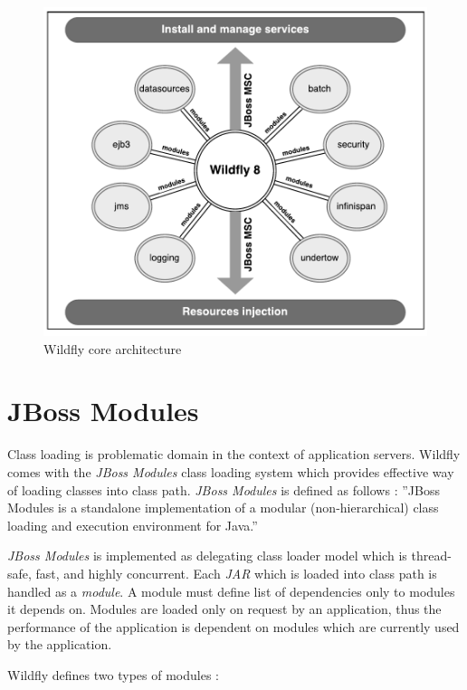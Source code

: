 \documentclass[12pt,oneside]{fithesis2}
\begin{document}
\begin{figure}[ht!]
	\centering
	\includegraphics[width=\textwidth]{images/wildfly_core}
	\caption{Wildfly core architecture \cite{wildfly_book}}
	\label{wildfly_core}
\end{figure}

\section{JBoss Modules}
\label{jboss_modules_sec}
Class loading is problematic domain in the context of application servers. Wildfly comes with the \textit{JBoss Modules} class loading system which provides effective way of loading classes into class path. \textit{JBoss Modules} is defined as follows \cite[Introduction]{jboss_modules_doc}: ''JBoss Modules is a standalone implementation of a modular (non-hierarchical) class loading and execution environment for Java.''

\textit{JBoss Modules} is implemented as delegating class loader model which is thread-safe, fast, and highly concurrent. Each \textit{JAR} which is loaded into class path is handled as a \textit{module}. A module must define list of dependencies only to modules it depends on. Modules are loaded only on request by an application, thus the performance of the application is dependent on modules which are currently used by the application.

Wildfly defines two types of modules \cite{wildfly_book}:
\end{document}
